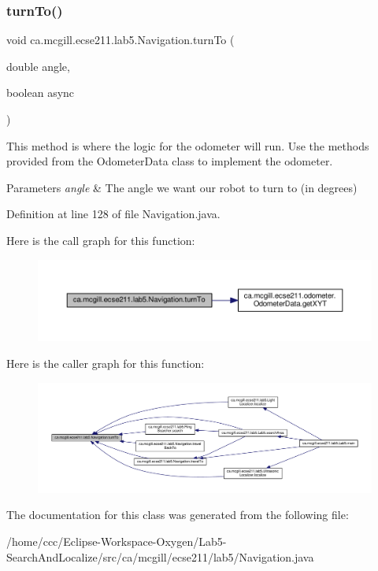 \subsubsection{\texorpdfstring{turn\+To()}{turnTo()}}
{\footnotesize\ttfamily void ca.\+mcgill.\+ecse211.\+lab5.\+Navigation.\+turn\+To (\begin{DoxyParamCaption}\item[{double}]{angle,  }\item[{boolean}]{async }\end{DoxyParamCaption})}

This method is where the logic for the odometer will run. Use the methods provided from the Odometer\+Data class to implement the odometer.


\begin{DoxyParams}{Parameters}
{\em angle} & The angle we want our robot to turn to (in degrees) \\
\hline
\end{DoxyParams}


Definition at line 128 of file Navigation.\+java.

Here is the call graph for this function\+:
\nopagebreak
\begin{figure}[H]
\begin{center}
\leavevmode
\includegraphics[width=350pt]{classca_1_1mcgill_1_1ecse211_1_1lab5_1_1_navigation_a2b39928c8062fe6863de8e818d009e91_cgraph}
\end{center}
\end{figure}
Here is the caller graph for this function\+:
\nopagebreak
\begin{figure}[H]
\begin{center}
\leavevmode
\includegraphics[width=350pt]{classca_1_1mcgill_1_1ecse211_1_1lab5_1_1_navigation_a2b39928c8062fe6863de8e818d009e91_icgraph}
\end{center}
\end{figure}


The documentation for this class was generated from the following file\+:\begin{DoxyCompactItemize}
\item 
/home/ccc/\+Eclipse-\/\+Workspace-\/\+Oxygen/\+Lab5-\/\+Search\+And\+Localize/src/ca/mcgill/ecse211/lab5/Navigation.\+java\end{DoxyCompactItemize}
